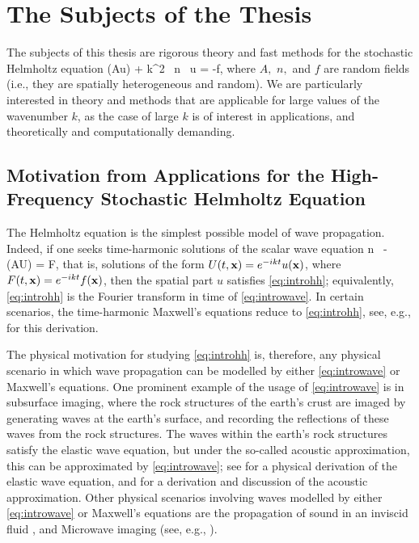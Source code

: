 \section{The Subjects of the Thesis}
The subjects of this thesis are rigorous theory and fast methods for the stochastic Helmholtz equation
\beq\label{eq:introhh}
\grad \cdot \mleft(A\grad u\mright) + k^2 \, n \, u = -f,
\eeq
where $A,$ $n,$ and $f$ are random fields (i.e., they are spatially heterogeneous and random). We are particularly interested in theory and methods that are applicable for large values of the wavenumber $k$, as the case of large $k$ is of interest in applications, and theoretically and computationally demanding.

\subsection{Motivation from Applications for the High-Frequency Stochastic Helmholtz Equation}

The Helmholtz equation is the simplest possible model of wave propagation. Indeed, if one seeks time-harmonic solutions of the scalar wave equation
\beq\label{eq:introwave}
n \,  - \grad \cdot\mleft(A\grad U\mright) = F,
\eeq
that is, solutions of the form $U(t,\mathbf{x}) = e^{-ikt}u(\mathbf{x})$, where $F(t,\mathbf{x}) = e^{-ikt}f(\mathbf{x})$, then the spatial part $u$ satisfies \eqref{eq:introhh}; equivalently, \eqref{eq:introhh} is the Fourier transform in time  of \eqref{eq:introwave}. In certain scenarios, the time-harmonic Maxwell's equations reduce to \eqref{eq:introhh}, see, e.g., \cite[Remark 2.1]{MoSp:19} for this derivation.

The physical motivation for studying \eqref{eq:introhh} is, therefore, any physical scenario in which wave propagation can be modelled by either \eqref{eq:introwave} or Maxwell's equations. One prominent example of the usage of \eqref{eq:introwave} is in subsurface imaging, where the rock structures of the earth's crust are imaged by generating waves at the earth's surface, and recording the reflections of these waves from the rock structures. The waves within the earth's rock structures satisfy the elastic wave equation, but under the so-called acoustic approximation, this can be approximated by \eqref{eq:introwave}; see \cite[Section 1.2]{Ch:15} for a physical derivation of the elastic wave equation, and \cite[Section 1.2.6]{Ch:15} for a derivation and discussion of the acoustic approximation. Other physical scenarios involving waves modelled by either \eqref{eq:introwave} or Maxwell's equations are the propagation of sound in an inviscid fluid \cite[Section 2.1]{CoKr:13}, and Microwave imaging (see, e.g., \cite[Section 6.4]{BoDoGrSpTo:19}).

